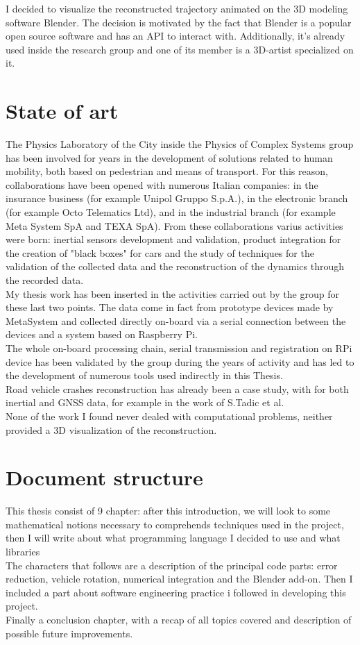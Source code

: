 \justify
I decided to visualize the reconstructed trajectory animated on the 3D modeling software Blender. The decision is motivated by the fact that Blender is a popular open source software and has an API to interact with. Additionally, it's already used inside the research group and one of its member is a 3D-artist specialized on it.

\section{State of art}
The Physics Laboratory of the City inside the Physics of Complex Systems group has been involved for years in the development of solutions related to human mobility, both based on pedestrian and means of transport. For this reason, collaborations have been opened with numerous Italian companies: in the insurance business (for example Unipol Gruppo S.p.A.), in the electronic branch (for example Octo Telematics Ltd), and in the industrial branch (for example Meta System SpA and TEXA SpA). From these collaborations varius activities were born: inertial sensors development and validation, product integration for the creation of "black boxes" for cars and the study of techniques for the validation of the collected data and the reconstruction of the dynamics through the recorded data. \\
My thesis work has been inserted in the activities carried out by the group for these last two points. The data come in fact from prototype devices made by MetaSystem and collected directly on-board via a serial connection between the devices and a system based on Raspberry Pi. \\
The whole on-board processing chain, serial transmission and registration on RPi device has been validated by the group during the years of activity and has led to the development of numerous tools used indirectly in this Thesis. 
\\
Road vehicle crashes reconstruction has already been a case study, with for both inertial and GNSS data, for example in the work of S.Tadic et al. \cite{7733120} \\
None of the work I found never dealed with computational problems, neither provided a 3D visualization of the reconstruction.

\section{Document structure}
This thesis consist of 9 chapter: after this introduction, we will look to some mathematical notions necessary to comprehends techniques used in the project, then I will write about what programming language I decided to use and what libraries \\
The characters that follows are a description of the principal code parts: error reduction, vehicle rotation, numerical integration and the Blender add-on. Then I included a part about software engineering practice i followed in developing this project. \\
Finally a conclusion chapter, with a recap of all topics covered and description of possible future improvements.